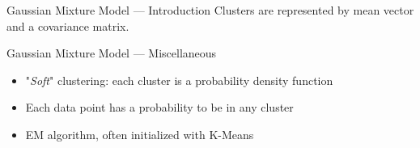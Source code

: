 \begin{frame}{Gaussian Mixture Model --- Introduction}
  Clusters are represented by mean vector and a covariance matrix.
\end{frame}

\begin{frame}{Gaussian Mixture Model --- Miscellaneous}
  \begin{itemize}
    \item "\textit{Soft}" clustering: each cluster is a probability density function
    \item Each data point has a probability to be in any cluster
    \item EM algorithm, often initialized with K-Means
  \end{itemize}
\end{frame}
